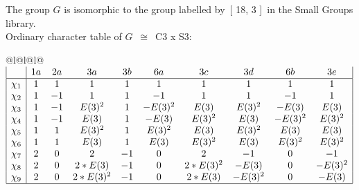 \documentclass[varwidth=\maxdimen,border=10]{standalone}
\begin{document}
The group $G$ is isomorphic to the group labelled by\ [ 18, 3 ]\ in the Small Groups library.\\
Ordinary character table of $G$\ $\cong$\ C3 x S3:\\
\begin{center}
\begin{tabular}{@{}l@{}l@{}l@{}}
\hline
\(\begin{array}{|l|ccccccccc|}
  & 1a & 2a & 3a & 3b & 6a & 3c & 3d & 6b & 3e\\ \hline
\chi_{1} & 1 & 1 & 1 & 1 & 1 & 1 & 1 & 1 & 1\\
\chi_{2} & 1 & -1 & 1 & 1 & -1 & 1 & 1 & -1 & 1\\
\chi_{3} & 1 & -1 & E(3)^{2} & 1 & -E(3)^{2} & E(3) & E(3)^{2} & -E(3) & E(3)\\
\chi_{4} & 1 & -1 & E(3) & 1 & -E(3) & E(3)^{2} & E(3) & -E(3)^{2} & E(3)^{2}\\
\chi_{5} & 1 & 1 & E(3)^{2} & 1 & E(3)^{2} & E(3) & E(3)^{2} & E(3) & E(3)\\
\chi_{6} & 1 & 1 & E(3) & 1 & E(3) & E(3)^{2} & E(3) & E(3)^{2} & E(3)^{2}\\
\chi_{7} & 2 & 0 & 2 & -1 & 0 & 2 & -1 & 0 & -1\\
\chi_{8} & 2 & 0 & 2*E(3) & -1 & 0 & 2*E(3)^{2} & -E(3) & 0 & -E(3)^{2}\\
\chi_{9} & 2 & 0 & 2*E(3)^{2} & -1 & 0 & 2*E(3) & -E(3)^{2} & 0 & -E(3)\\
\hline
\end{array}\)\\
\end{tabular}
\end{center}
\end{document}
